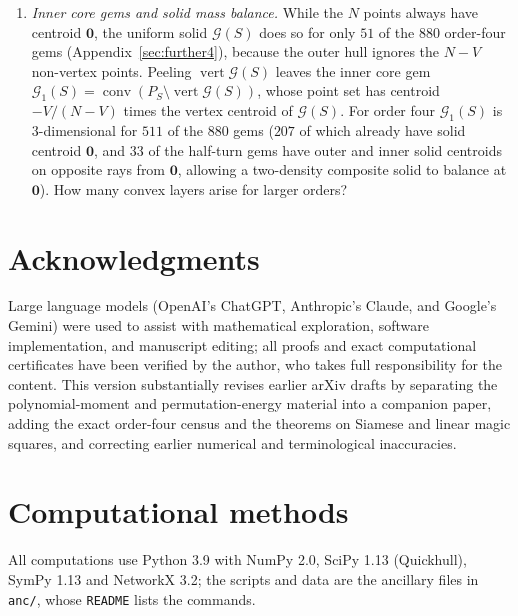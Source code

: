 \documentclass[11pt,a4paper]{article}
\theoremstyle{plain}
\theoremstyle{definition}
\theoremstyle{remark}
\begin{document}
\begin{enumerate}
\item \emph{Inner core gems and solid mass balance.} While the $N$ points always have centroid $\mathbf 0$, the uniform solid $\mathcal G(S)$ does so for only $51$ of the $880$ order-four gems (Appendix~\ref{sec:further4}), because the outer hull ignores the $N-V$ non-vertex points. Peeling $\operatorname{vert}\mathcal G(S)$ leaves the inner core gem $\mathcal G_1(S)=\operatorname{conv}(P_S\setminus\operatorname{vert}\mathcal G(S))$, whose point set has centroid $-V/(N-V)$ times the vertex centroid of $\mathcal G(S)$. For order four $\mathcal G_1(S)$ is $3$-dimensional for $511$ of the $880$ gems ($207$ of which already have solid centroid $\mathbf 0$, and $33$ of the half-turn gems have outer and inner solid centroids on opposite rays from $\mathbf 0$, allowing a two-density composite solid to balance at $\mathbf 0$). How many convex layers arise for larger orders?
\end{enumerate}

\section*{Acknowledgments}
\label{sec:ai_statement}

Large language models (OpenAI's ChatGPT, Anthropic's Claude, and Google's Gemini) were used to assist with mathematical exploration, software implementation, and manuscript editing; all proofs and exact computational certificates have been verified by the author, who takes full responsibility for the content. This version substantially revises earlier arXiv drafts by separating the polynomial-moment and permutation-energy material into a companion paper, adding the exact order-four census and the theorems on Siamese and linear magic squares, and correcting earlier numerical and terminological inaccuracies.



{\small\setlength{\itemsep}{0pt}}

\appendix
\section{Computational methods}
\label{sec:appendix}

All computations use Python 3.9 with NumPy 2.0, SciPy 1.13 (Quickhull), SymPy 1.13 and NetworkX 3.2; the scripts and data are the ancillary files in \texttt{anc/}, whose \texttt{README} lists the commands.
\end{document}
